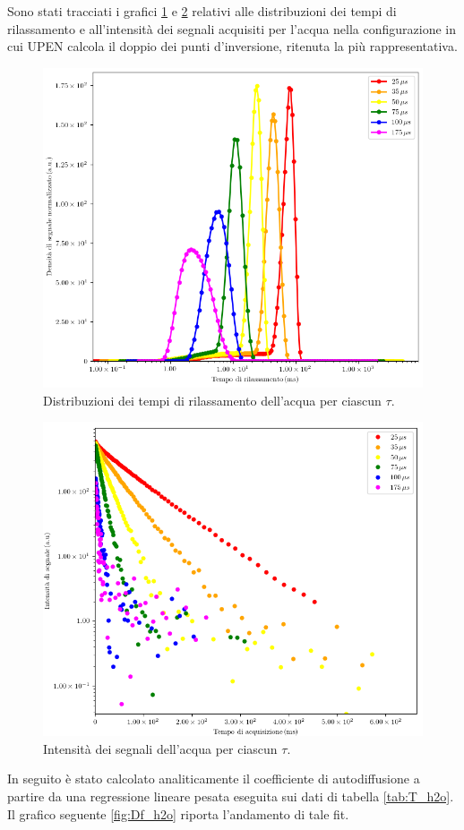 Sono stati tracciati i grafici \ref{fig:D_h2o} e \ref{fig:S_h2o} relativi alle distribuzioni dei tempi di rilassamento e all'intensità dei segnali acquisiti per l'acqua nella configurazione in cui UPEN calcola il doppio dei punti d'inversione, ritenuta la più rappresentativa.

\begin{figure}[p]
\centering
\includegraphics[width=\columnwidth]{Figure/H2O.png}
\caption{Distribuzioni dei tempi di rilassamento dell'acqua per ciascun $\tau$.}
\label{fig:D_h2o}
\end{figure}

\begin{figure}[p]
\centering
\includegraphics[width=\columnwidth]{Figure/H2O_SigTSig.png}
\caption{Intensità dei segnali dell'acqua per ciascun $\tau$.}
\label{fig:S_h2o}
\end{figure}
\newpage
In seguito è stato calcolato analiticamente il coefficiente di autodiffusione a partire da una regressione lineare pesata eseguita sui dati di tabella \ref{tab:T_h2o}.
Il grafico seguente \ref{fig:Df_h2o} riporta l'andamento di tale fit.

